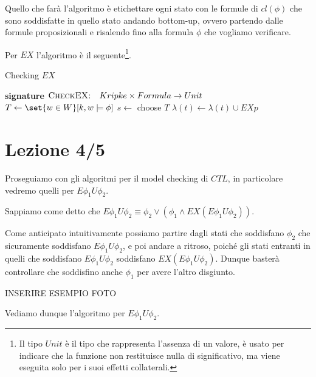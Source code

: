 Quello che farà l'algoritmo è etichettare ogni stato con le formule di \(cl(\phi)\) che sono soddisfatte in quello stato andando bottom-up\@, ovvero partendo dalle formule proposizionali e risalendo fino alla formula \(\phi\) che vogliamo verificare.

Per \(EX\) l'algoritmo è il seguente\footnote{Il tipo \(Unit\) è il tipo che rappresenta l'assenza di un valore, è usato per indicare che la funzione non restituisce nulla di significativo, ma viene eseguita solo per i suoi effetti collaterali.}.

\begin{algorithmdesc}{Checking \(EX\)}
  \begin{algorithmic}[1]
    \Statex{} \textbf{signature} \(\textsc{CheckEX:} \quad Kripke \times Formula \to Unit\)
    \State{} \(T \gets \set{w \in W}[k,w\models \phi]\)
    \State{} \(s \gets\) choose \(T\)
    \State{} \(\lambda(t)\gets \lambda(t)\cup{EX p}\)
    \EndFor{}
    \EndWhile{}
    \EndFunction{}
  \end{algorithmic}
\end{algorithmdesc}

\chapter{Lezione 4/5}

Proseguiamo con gli algoritmi per il model checking di \(CTL\)\@, in particolare vedremo quelli per \(E\phi_1 U \phi_2\).

Sappiamo come detto che \(E \phi_1 U \phi_2 \equiv \phi_2 \lor (\phi_1 \land EX(E \phi_1 U \phi_2))\).

Come anticipato intuitivamente possiamo partire dagli stati che soddisfano \(\phi_2\) che sicuramente soddisfano \(E \phi_1 U \phi_2\), e poi andare a ritroso, poiché gli stati entranti in quelli che soddisfano \(E \phi_1 U \phi_2\) soddisfano \(EX(E \phi_1 U \phi_2)\). Dunque basterà controllare che soddisfino anche \(\phi_1\) per avere l'altro disgiunto.

INSERIRE ESEMPIO FOTO

Vediamo dunque l'algoritmo per \(E\phi_1 U \phi_2\).

